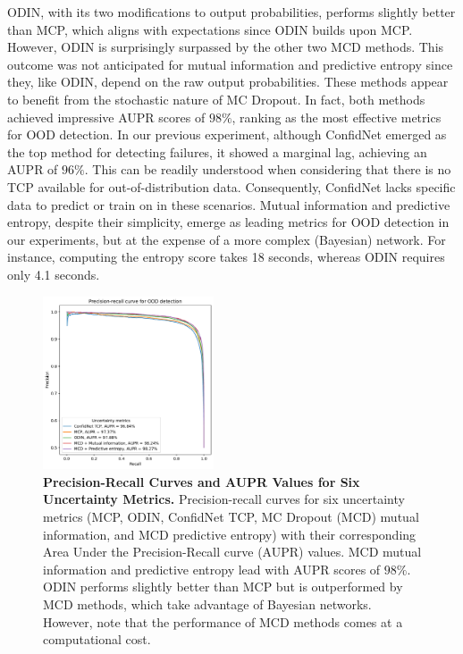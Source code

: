 ODIN, with its two modifications to output probabilities, performs slightly better than MCP, which aligns with expectations since ODIN builds upon MCP. However, ODIN is surprisingly surpassed by the other two MCD methods. This outcome was not anticipated for mutual information and predictive entropy since they, like ODIN, depend on the raw output probabilities. These methods appear to benefit from the stochastic nature of MC Dropout. In fact, both methods achieved impressive AUPR scores of $98\%$, ranking as the most effective metrics for OOD detection. In our previous experiment, although ConfidNet emerged as the top method for detecting failures, it showed a marginal lag, achieving an AUPR of $96\%$. This can be readily understood when considering that there is no TCP available for out-of-distribution data. Consequently, ConfidNet lacks specific data to predict or train on in these scenarios. Mutual information and predictive entropy, despite their simplicity, emerge as leading metrics for OOD detection in our experiments, but at the expense of a more complex (Bayesian) network. For instance, computing the entropy score takes 18 seconds, whereas ODIN requires only 4.1 seconds.
\begin{figure}[H]
    \centering
    \includegraphics[width=0.45\textwidth]{OOD_aupr.pdf}
    \caption{\textbf{Precision-Recall Curves and AUPR Values for Six Uncertainty Metrics.} Precision-recall curves for six uncertainty metrics (MCP, ODIN, ConfidNet TCP, MC Dropout (MCD) mutual information, and MCD predictive entropy) with their corresponding Area Under the Precision-Recall curve (AUPR) values. MCD mutual information and predictive entropy lead with AUPR scores of $98\%$. ODIN performs slightly better than MCP but is outperformed by MCD methods, which take advantage of Bayesian networks. However, note that the performance of MCD methods comes at a computational cost.}
    \label{fig:OOD_aupr}
\end{figure}

